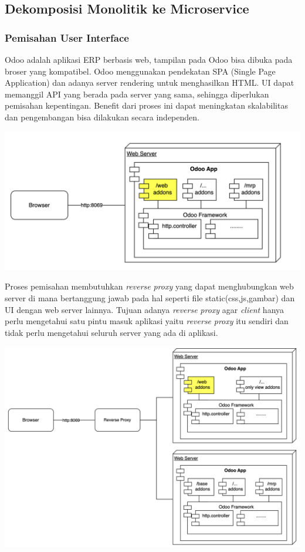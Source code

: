 \subsection{Dekomposisi Monolitik ke Microservice}
\subsubsection{Pemisahan User Interface}
Odoo adalah aplikasi ERP berbasis web, tampilan pada Odoo bisa dibuka pada broser yang kompatibel. Odoo menggunakan pendekatan SPA (Single Page Application) dan adanya server rendering untuk menghasilkan HTML. UI dapat memanggil API yang berada pada server yang sama, sehingga diperlukan pemisahan kepentingan. Benefit dari proses ini dapat meningkatan skalabilitas dan pengembangan bisa dilakukan secara independen.
\begin{center}
	\includegraphics[width=14cm]{img/bab_3/monoUI.png}
	\label{fig:asd}
\end{center}
Proses pemisahan membutuhkan \textit{reverse} \textit{proxy} yang dapat menghubungkan web server di mana bertanggung jawab pada hal seperti file static(css,js,gambar) dan UI dengan web server lainnya. Tujuan adanya \textit{reverse} \textit{proxy} agar \textit{client} hanya perlu mengetahui satu pintu masuk aplikasi yaitu \textit{reverse} \textit{proxy} itu sendiri dan tidak perlu mengetahui seluruh server yang ada di aplikasi.
\begin{center}
	\includegraphics[width=14cm]{img/bab_3/microUI.png}
	\label{fig:asd}
\end{center}

